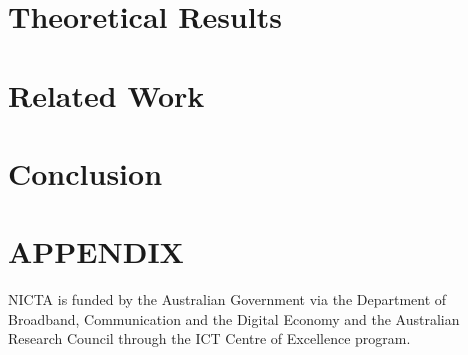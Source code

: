 \documentclass[prodmode,acmtecs]{acmsmall}
\begin{document}
\section{Theoretical Results}
\label{sec:theory}


%

\section{Related Work}
\label{sec:related_work}


\section{Conclusion}
\label{sec:conclusion}




\appendix
\section*{APPENDIX}


\begin{acks}
NICTA is funded by the Australian Government via 
the Department of Broadband, Communication and the Digital
Economy and the Australian Research Council through the ICT
Centre of Excellence program.
\end{acks}





%
%
%
\end{document}
